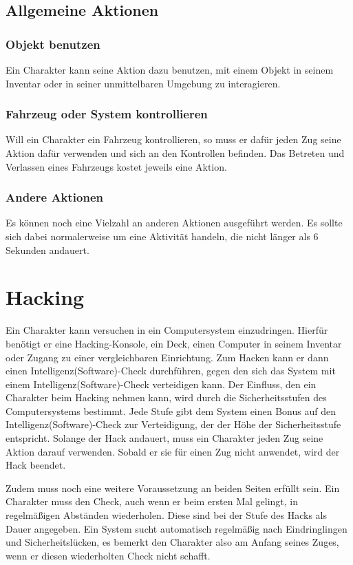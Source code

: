 \subsection{Allgemeine Aktionen}
\subsubsection{Objekt benutzen}
Ein Charakter kann seine Aktion dazu benutzen, mit einem Objekt in seinem Inventar oder in seiner unmittelbaren Umgebung zu interagieren.
\subsubsection{Fahrzeug oder System kontrollieren}
Will ein Charakter ein Fahrzeug kontrollieren, so muss er dafür jeden Zug seine Aktion dafür verwenden und sich an den Kontrollen befinden. Das Betreten und Verlassen eines Fahrzeugs kostet jeweils eine Aktion.
\subsubsection{Andere Aktionen}
Es können noch eine Vielzahl an anderen Aktionen ausgeführt werden. Es sollte sich dabei normalerweise um eine Aktivität handeln, die nicht länger als 6 Sekunden andauert.
\section{Hacking}
Ein Charakter kann versuchen in ein Computersystem einzudringen. Hierfür benötigt er eine Hacking-Konsole, ein Deck, einen Computer in seinem Inventar oder Zugang zu einer vergleichbaren Einrichtung. Zum Hacken kann er dann einen Intelligenz(Software)-Check durchführen, gegen den sich das System mit einem Intelligenz(Software)-Check verteidigen kann. Der Einfluss, den ein Charakter beim Hacking nehmen kann, wird durch die Sicherheitsstufen des Computersystems bestimmt. Jede Stufe gibt dem System einen Bonus auf den Intelligenz(Software)-Check zur Verteidigung, der der Höhe der Sicherheitsstufe entspricht. Solange der Hack andauert, muss ein Charakter jeden Zug seine Aktion darauf verwenden. Sobald er sie für einen Zug nicht anwendet, wird der Hack beendet.

Zudem muss noch eine weitere Voraussetzung an beiden Seiten erfüllt sein. Ein Charakter muss den Check, auch wenn er beim ersten Mal gelingt, in regelmäßigen Abständen wiederholen. Diese sind bei der Stufe des Hacks als \glqq Dauer\grqq{} angegeben. Ein System sucht automatisch regelmäßig nach Eindringlingen und Sicherheitslücken, es bemerkt den Charakter also am Anfang seines Zuges, wenn er diesen wiederholten Check nicht schafft.

